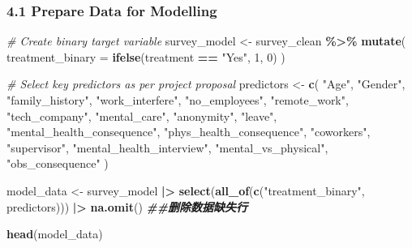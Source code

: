 \documentclass[
]{article}
\newenvironment{Shaded}{\begin{snugshade}}{\end{snugshade}}
\newcommand{\AttributeTok}[1]{\textcolor[rgb]{0.13,0.29,0.53}{#1}}
\newcommand{\CommentTok}[1]{\textcolor[rgb]{0.56,0.35,0.01}{\textit{#1}}}
\newcommand{\DecValTok}[1]{\textcolor[rgb]{0.00,0.00,0.81}{#1}}
\newcommand{\DocumentationTok}[1]{\textcolor[rgb]{0.56,0.35,0.01}{\textbf{\textit{#1}}}}
\newcommand{\FunctionTok}[1]{\textcolor[rgb]{0.13,0.29,0.53}{\textbf{#1}}}
\newcommand{\NormalTok}[1]{#1}
\newcommand{\OtherTok}[1]{\textcolor[rgb]{0.56,0.35,0.01}{#1}}
\newcommand{\SpecialCharTok}[1]{\textcolor[rgb]{0.81,0.36,0.00}{\textbf{#1}}}
\newcommand{\StringTok}[1]{\textcolor[rgb]{0.31,0.60,0.02}{#1}}
\begin{document}
\subsubsection{4.1 Prepare Data for
Modelling}\label{prepare-data-for-modelling}

\begin{Shaded}
\begin{Highlighting}[]
\CommentTok{\# Create binary target variable}
\NormalTok{survey\_model }\OtherTok{\textless{}{-}}\NormalTok{ survey\_clean }\SpecialCharTok{\%\textgreater{}\%}
  \FunctionTok{mutate}\NormalTok{(}
    \AttributeTok{treatment\_binary =} \FunctionTok{ifelse}\NormalTok{(treatment }\SpecialCharTok{==} \StringTok{"Yes"}\NormalTok{, }\DecValTok{1}\NormalTok{, }\DecValTok{0}\NormalTok{)}
\NormalTok{  )}

\CommentTok{\# Select key predictors as per project proposal}
\NormalTok{predictors }\OtherTok{\textless{}{-}} \FunctionTok{c}\NormalTok{(}
  \StringTok{"Age"}\NormalTok{, }\StringTok{"Gender"}\NormalTok{, }\StringTok{"family\_history"}\NormalTok{,}
  \StringTok{"work\_interfere"}\NormalTok{, }\StringTok{"no\_employees"}\NormalTok{, }\StringTok{"remote\_work"}\NormalTok{, }\StringTok{"tech\_company"}\NormalTok{,}
  \StringTok{"mental\_care"}\NormalTok{,}
  \StringTok{"anonymity"}\NormalTok{, }\StringTok{"leave"}\NormalTok{,}
  \StringTok{"mental\_health\_consequence"}\NormalTok{, }\StringTok{"phys\_health\_consequence"}\NormalTok{,}
  \StringTok{"coworkers"}\NormalTok{, }\StringTok{"supervisor"}\NormalTok{, }\StringTok{"mental\_health\_interview"}\NormalTok{,}
  \StringTok{"mental\_vs\_physical"}\NormalTok{, }\StringTok{"obs\_consequence"}
\NormalTok{)}

\NormalTok{model\_data }\OtherTok{\textless{}{-}}\NormalTok{ survey\_model }\SpecialCharTok{|\textgreater{}}
  \FunctionTok{select}\NormalTok{(}\FunctionTok{all\_of}\NormalTok{(}\FunctionTok{c}\NormalTok{(}\StringTok{"treatment\_binary"}\NormalTok{, predictors))) }\SpecialCharTok{|\textgreater{}}
  \FunctionTok{na.omit}\NormalTok{() }\DocumentationTok{\#\#删除数据缺失行}

\FunctionTok{head}\NormalTok{(model\_data)}
\end{Highlighting}
\end{Shaded}
\end{document}
